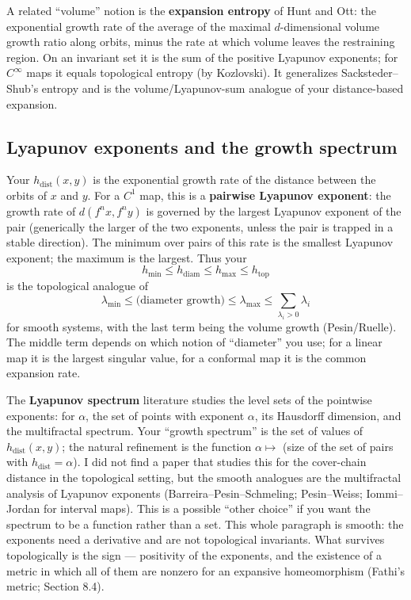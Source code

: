 \documentclass[
]{article}
\begin{document}
A related ``volume'' notion is the \textbf{expansion entropy} of Hunt
and Ott: the exponential growth rate of the average of the maximal
\(d\)-dimensional volume growth ratio along orbits, minus the rate at
which volume leaves the restraining region. On an invariant set it is
the sum of the positive Lyapunov exponents; for \(C^\infty\) maps it
equals topological entropy (by Kozlovski). It generalizes
Sacksteder--Shub's entropy and is the volume/Lyapunov-sum analogue of
your distance-based expansion.

\subsection{Lyapunov exponents and the growth
spectrum}\label{lyapunov-exponents-and-the-growth-spectrum}

Your \(h_{\mathrm{dist}}(x,y)\) is the exponential growth rate of the
distance between the orbits of \(x\) and \(y\). For a \(C^1\) map, this
is a \textbf{pairwise Lyapunov exponent}: the growth rate of
\(d(f^n x,f^n y)\) is governed by the largest Lyapunov exponent of the
pair (generically the larger of the two exponents, unless the pair is
trapped in a stable direction). The minimum over pairs of this rate is
the smallest Lyapunov exponent; the maximum is the largest. Thus your \[
h_{\min}\le h_{\mathrm{diam}}\le h_{\max}\le h_{\mathrm{top}}
\] is the topological analogue of \[
\lambda_{\min}\le \text{(diameter growth)}\le \lambda_{\max}\le \sum_{\lambda_i>0}\lambda_i
\] for smooth systems, with the last term being the volume growth
(Pesin/Ruelle). The middle term depends on which notion of ``diameter''
you use; for a linear map it is the largest singular value, for a
conformal map it is the common expansion rate.

The \textbf{Lyapunov spectrum} literature studies the level sets of the
pointwise exponents: for \(\alpha\), the set of points with exponent
\(\alpha\), its Hausdorff dimension, and the multifractal spectrum. Your
``growth spectrum'' is the set of values of \(h_{\mathrm{dist}}(x,y)\);
the natural refinement is the function \(\alpha\mapsto\) (size of the
set of pairs with \(h_{\mathrm{dist}}=\alpha\)). I did not find a paper
that studies this for the cover-chain distance in the topological
setting, but the smooth analogues are the multifractal analysis of
Lyapunov exponents (Barreira--Pesin--Schmeling; Pesin--Weiss;
Iommi--Jordan for interval maps). This is a possible ``other choice'' if
you want the spectrum to be a function rather than a set. This whole
paragraph is smooth: the exponents need a derivative and are not
topological invariants. What survives topologically is the sign ---
positivity of the exponents, and the existence of a metric in which all
of them are nonzero for an expansive homeomorphism (Fathi's metric;
Section 8.4).
\end{document}

